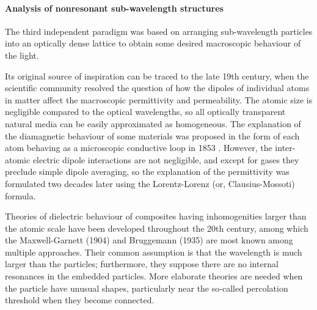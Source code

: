 \paragraph{Analysis of nonresonant sub-wavelength structures} %
The third independent paradigm was based on arranging sub-wavelength particles into an optically dense lattice to obtain some desired macroscopic behaviour of the light. 

Its original source of inspiration can be traced to the late 19th century, when the scientific community resolved the question of how the dipoles of individual atoms in matter affect the macroscopic permittivity and permeability. 
The atomic size is negligible compared to the optical wavelengths, so all optically transparent natural media can be easily approximated as homogeneous. The explanation of the diamagnetic behaviour of some materials was proposed in the form of  each atom behaving as a microscopic conductive loop in 1853 \cite{weber1852relationship}. However, the inter-atomic electric dipole interactions are not negligible, and except for gases they preclude simple dipole averaging, so the explanation of the permittivity was formulated two decades later using the Lorentz-Lorenz (or, Clausius-Mossoti) formula.

Theories of dielectric behaviour of composites having inhomogenities larger than the atomic scale have been developed throughout the 20th century, among which the Maxwell-Garnett (1904) and Bruggemann (1935) are most known among multiple approaches. 
Their common assumption is that the wavelength is much larger than the particles; furthermore, they suppose there are no internal resonances in the embedded particles. More elaborate theories are needed when the particle have unusual shapes, particularly near the so-called percolation threshold when they become connected.


